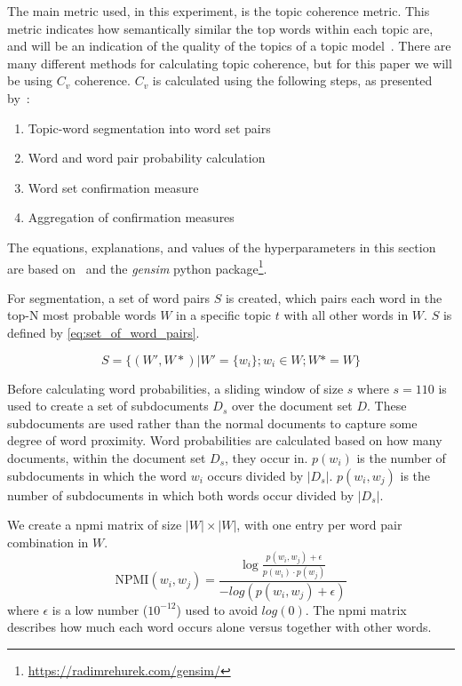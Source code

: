 The main metric used, in this experiment, is the topic coherence metric.
This metric indicates how semantically similar the top words within each topic are, and will be an indication of the quality of the topics of a topic model~\cite{topic_coherence_2015}.
There are many different methods for calculating topic coherence, but for this paper we will be using $C_v$ coherence.
$C_v$ is calculated using the following steps, as presented by~\citet{Syed2017coherence}:
\begin{enumerate}
	\item Topic-word segmentation into word set pairs
	\item Word and word pair probability calculation
	\item Word set confirmation measure
	\item Aggregation of confirmation measures
\end{enumerate}
The equations, explanations, and values of the hyperparameters in this section are based on~\citet{Syed2017coherence} and the \textit{gensim} python package\footnote{\url{https://radimrehurek.com/gensim/}}.

For segmentation, a set of word pairs $S$ is created, which pairs each word in the top-N most probable words $W$ in a specific topic $t$ with all other words in $W$.
$S$ is defined by \autoref{eq:set_of_word_pairs}.

\begin{equation}\label{eq:set_of_word_pairs}
	S = \{(W', W*)|W' = \{w_i\};w_i \in W;W* = W\}
\end{equation}

Before calculating word probabilities, a sliding window of size $s$ where $s =110$ is used to create a set of subdocuments $D_s$ over the document set $D$.
These subdocuments are used rather than the normal documents to capture some degree of word proximity.
Word probabilities are calculated based on how many documents, within the document set $D_s$, they occur in.
$p(w_i)$ is the number of subdocuments in which the word $w_i$ occurs divided by $|D_s|$.
$p(w_i, w_j)$ is the number of subdocuments in which both words occur divided by $|D_s|$. 

We create a \gls{npmi} matrix of size $|W|\times|W|$, with one entry per word pair combination in $W$.
\begin{equation}\label{eq:coherence_2}
	\text{NPMI}(w_i,w_j) =  \frac{\log\frac{p(w_i,w_j) + \epsilon}{p(w_i)\cdot p(w_j)}}{-log(p(w_i,w_j) + \epsilon)}
\end{equation}
\noindent where $\epsilon$ is a low number ($10^{-12}$) used to avoid $log(0)$.
The \gls{npmi} matrix describes how much each word occurs alone versus together with other words.

